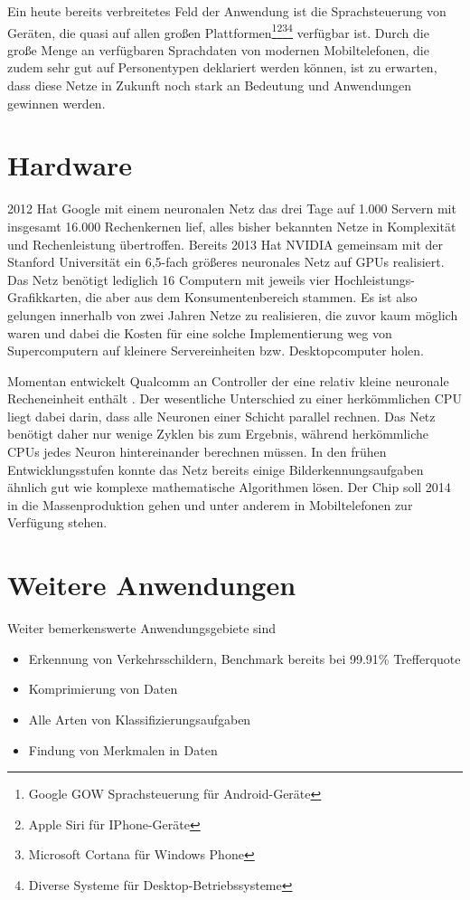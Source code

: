 Ein heute bereits verbreitetes Feld der Anwendung ist die Sprachsteuerung von Geräten, die quasi auf allen großen Plattformen\footnote{Google GOW Sprachsteuerung für Android-Geräte}\footnote{Apple Siri für IPhone-Geräte}\footnote{Microsoft Cortana für Windows Phone}\footnote{Diverse Systeme für Desktop-Betriebssysteme} verfügbar ist. Durch die große Menge an verfügbaren Sprachdaten von modernen Mobiltelefonen, die zudem sehr gut auf Personentypen deklariert werden können, ist zu erwarten, dass diese Netze in Zukunft noch stark an Bedeutung und Anwendungen gewinnen werden.

\section{Hardware}

2012 Hat Google mit einem neuronalen Netz das drei Tage auf 1.000 Servern mit insgesamt 16.000 Rechenkernen lief, alles bisher bekannten Netze in Komplexität und Rechenleistung übertroffen. Bereits 2013 Hat NVIDIA gemeinsam mit der Stanford Universität \citep{nvidia} ein 6,5-fach größeres neuronales Netz auf GPUs realisiert. Das Netz benötigt lediglich 16 Computern mit jeweils vier Hochleistungs-Grafikkarten, die aber aus dem Konsumentenbereich stammen. Es ist also gelungen innerhalb von zwei Jahren Netze zu realisieren, die zuvor kaum möglich waren und dabei die Kosten für eine solche Implementierung weg von Supercomputern auf kleinere Servereinheiten bzw. Desktopcomputer holen.

Momentan entwickelt Qualcomm an Controller der eine relativ kleine neuronale Recheneinheit enthält \citep{Qualcomm}. Der wesentliche Unterschied zu einer herkömmlichen CPU liegt dabei darin, dass alle Neuronen einer Schicht parallel rechnen. Das Netz benötigt daher nur wenige Zyklen bis zum Ergebnis, während herkömmliche CPUs jedes Neuron hintereinander berechnen müssen. In den frühen Entwicklungsstufen konnte das Netz bereits einige Bilderkennungsaufgaben ähnlich gut wie komplexe mathematische Algorithmen lösen. Der Chip soll 2014 in die Massenproduktion gehen und unter anderem in Mobiltelefonen zur Verfügung stehen.

\section{Weitere Anwendungen}

Weiter bemerkenswerte Anwendungsgebiete sind

\begin{itemize}
\item Erkennung von Verkehrsschildern, Benchmark bereits bei 99.91\% Trefferquote \citep{trafficsign}
\item Komprimierung von Daten \citep{compression}
\item Alle Arten von Klassifizierungsaufgaben \citep{ClassificationMedicine} \citep{ClassificationWithNeuralNetworks}
\item Findung von Merkmalen in Daten \citep{FeatureDetection}
\end{itemize}

